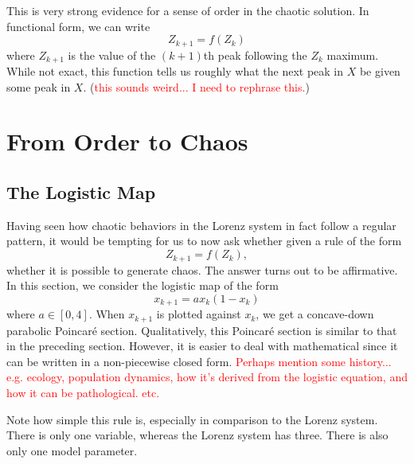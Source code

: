 \documentclass[twocolumn,amsmath,amssymb,aps]{revtex4}
\begin{document}
This is very strong evidence for a sense of order in the chaotic solution. In functional form, we can write
\begin{equation*}
Z_{k+1} = f(Z_k)
\end{equation*}
where $Z_{k+1}$ is the value of the $(k+1)$th peak following the $Z_{k}$ maximum. While not exact, this function tells us roughly what the next peak in $X$ be given some peak in $X$. (\textcolor{red}{this sounds weird... I need to rephrase this.})



\section{From Order to Chaos}
\subsection{The Logistic Map}
Having seen how chaotic behaviors in the Lorenz system in fact follow a regular pattern, it would be tempting for us to now ask whether given a rule of the form 
\begin{equation*}
Z_{k+1} = f(Z_k),
\end{equation*}
whether it is possible to generate chaos. The answer turns out to be affirmative. In this section, we consider the logistic map of the form
\begin{equation*}
x_{k+1} = ax_k(1-  x_k)
\end{equation*}
where $a \in [0,4]$. When $x_{k+1}$ is plotted against $x_{k}$, we get a concave-down parabolic Poincar\'{e} section. Qualitatively, this Poincar\'{e} section is similar to that in the preceding section. However, it is easier to deal with mathematical since it can be written in a non-piecewise 
closed form. \textcolor{red}{Perhaps mention some history... e.g. ecology, population dynamics, how it's derived from the logistic equation, and how it can be pathological. etc.}

Note how simple this rule is, especially in comparison to the Lorenz system. There is only one variable, whereas the Lorenz system has three. There is also only one model parameter. 
\end{document}
